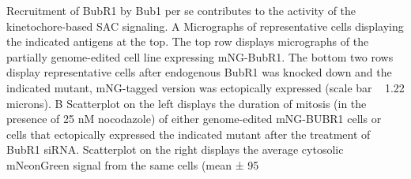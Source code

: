 Recruitment of BubR1 by Bub1 per se contributes to the activity of the kinetochore-based SAC signaling. A Micrographs of representative cells displaying the indicated antigens at the top. The top row displays micrographs of the partially genome-edited cell line expressing mNG-BubR1. The bottom two rows display representative cells after endogenous BubR1 was knocked down and the indicated mutant, mNG-tagged version was ectopically expressed (scale bar ~ 1.22 microns). B Scatterplot on the left displays the duration of mitosis (in the presence of 25 nM nocodazole) of either genome-edited mNG-BUBR1 cells or cells that ectopically expressed the indicated mutant after the treatment of BubR1 siRNA. Scatterplot on the right displays the average cytosolic mNeonGreen signal from the same cells (mean ± 95%